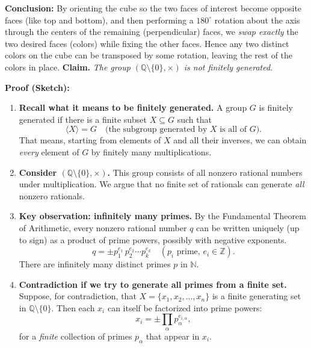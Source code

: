 \documentclass[12pt]{article}
\theoremstyle{definition} %
\theoremstyle{plain} %
\begin{document}
\bigskip

\noindent
\textbf{Conclusion:} 
By orienting the cube so the two faces of interest become opposite faces (like top and bottom), and then performing a \(180^\circ\) rotation about the axis through the centers of the remaining (perpendicular) faces, we \emph{swap exactly} the two desired faces (colors) while fixing the other faces. Hence any two distinct colors on the cube can be transposed by some rotation, leaving the rest of the colors in place.
\noindent
\textbf{Claim.} \emph{The group $(\mathbb{Q}\setminus\{0\},\times)$ is not finitely generated.}

\bigskip

\noindent
\textbf{Proof (Sketch):}

\begin{enumerate}
    \item \textbf{Recall what it means to be finitely generated.}
    A group $G$ is finitely generated if there is a finite subset $X \subseteq G$ such that 
    \[
      \langle X \rangle = G 
      \quad\text{(the subgroup generated by $X$ is all of $G$).}
    \]
    That means, starting from elements of $X$ and all their inverses, we can obtain \emph{every} element of $G$ by finitely many multiplications.

    \item \textbf{Consider $(\mathbb{Q}\setminus\{0\},\times)$.}
    This group consists of all nonzero rational numbers under multiplication.  We argue that no finite set of rationals can generate \emph{all} nonzero rationals.

    \item \textbf{Key observation: infinitely many primes.}
    By the Fundamental Theorem of Arithmetic, every nonzero rational number $q$ can be written uniquely (up to sign) as a product of prime powers, possibly with negative exponents. 
    \[
      q 
      = \pm p_1^{e_1} \, p_2^{e_2} \cdots p_k^{e_k} \quad (p_i \text{ prime, } e_i \in \mathbb{Z}).
    \]
    There are infinitely many distinct primes $p$ in $\mathbb{N}$. 

    \item \textbf{Contradiction if we try to generate all primes from a finite set.}
    Suppose, for contradiction, that $X = \{x_1,x_2,\dots,x_n\}$ is a finite generating set in $\mathbb{Q}\setminus\{0\}$.  Then each $x_i$ can itself be factorized into prime powers:
    \[
      x_i = \pm \prod_{\alpha} p_{\alpha}^{e_{i,\alpha}},
    \]
    for a \emph{finite} collection of primes $p_{\alpha}$ that appear in $x_i$.


\end{enumerate}
\end{document}

